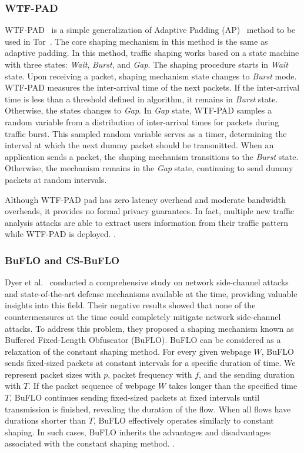 \subsubsection{WTF-PAD}\label{subsubsec:wtf-pad}
WTF-PAD~\cite{juarez2016toward} is a simple generalization of Adaptive Padding (AP)~\cite{shmatikov2006timing} method to be used in Tor~\cite{dingledine2004tor}. 
The core shaping mechanism in this method is the same as adaptive padding. 
In this method, traffic shaping works based on a state machine with three states: \textit{Wait}, \textit{Burst}, and \textit{Gap}. 
The shaping procedure starts in \textit{Wait} state. 
Upon receiving a packet, shaping mechanism state changes to \textit{Burst} mode. 
WTF-PAD measures the inter-arrival time of the next packets. 
If the inter-arrival time is less than a threshold defined in algorithm, it remains in \textit{Burst} state. Otherwise, the states changes to \textit{Gap}.
In \textit{Gap} state, WTF-PAD samples a random variable from a distribution of inter-arrival times for packets during traffic burst.
This sampled random variable serves as a timer, determining the interval at which the next dummy packet should be transmitted.
When an application sends a packet, the shaping mechanism transitions to the \textit{Burst} state. Otherwise, the mechanism remains in the \textit{Gap} state, continuing to send dummy packets at random intervals. 

Although WTF-PAD pad has zero latency overhead and moderate bandwidth overheads, it provides no formal privacy guarantees.
In fact, multiple new traffic analysis attacks are able to extract users information from their traffic pattern while WTF-PAD is deployed.
.


\subsubsection{BuFLO and CS-BuFLO}\label{subsubsec:buflo}
Dyer et al.~\cite{dyer2012peek} conducted a comprehensive study on network side-channel attacks and state-of-the-art defense mechanisms available at the time, providing valuable insights into this field. 
Their negative results showed that none of the countermeasures at the time could completely mitigate network side-channel attacks.
To address this problem, they proposed a shaping mechanism known as Buffered Fixed-Length Obfuscator (BuFLO).
BuFLO can be considered as a relaxation of the constant shaping method.
For every given webpage $W$, BuFLO sends fixed-sized packets at constant intervals for a specific duration of time.
We represent packet sizes with $p$, packet frequency with $f$, and the sending duration with $T$. 
If the packet sequence of webpage $W$ takes longer than the specified time $T$, BuFLO continues sending fixed-sized packets at fixed intervals until transmission is finished, revealing the duration of the flow. 
When all flows have durations shorter than $T$, BuFLO effectively operates similarly to constant shaping.
In such cases, BuFLO inherits the advantages and disadvantages associated with the constant shaping method.
.

